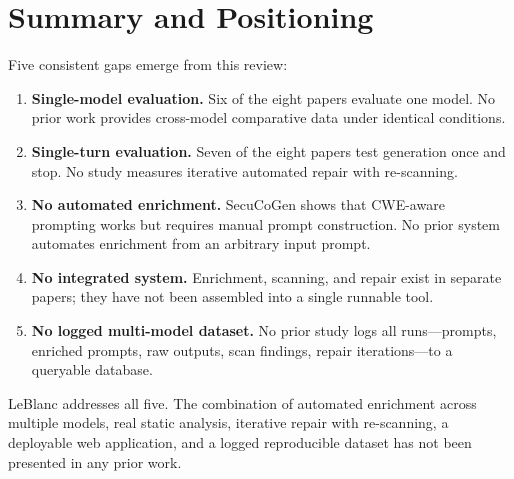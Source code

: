 \documentclass[12pt,a4paper]{report}
\begin{document}
\section{Summary and Positioning}
\label{sec:litgapsummary}

Five consistent gaps emerge from this review:

\begin{enumerate}
  \item \textbf{Single-model evaluation.} Six of the eight papers evaluate one
        model. No prior work provides cross-model comparative data under identical
        conditions.
  \item \textbf{Single-turn evaluation.} Seven of the eight papers test generation
        once and stop. No study measures iterative automated repair with
        re-scanning.
  \item \textbf{No automated enrichment.} SecuCoGen shows that CWE-aware prompting
        works but requires manual prompt construction. No prior system automates
        enrichment from an arbitrary input prompt.
  \item \textbf{No integrated system.} Enrichment, scanning, and repair exist in
        separate papers; they have not been assembled into a single runnable tool.
  \item \textbf{No logged multi-model dataset.} No prior study logs all
        runs---prompts, enriched prompts, raw outputs, scan findings, repair
        iterations---to a queryable database.
\end{enumerate}

LeBlanc addresses all five. The combination of automated enrichment across
multiple models, real static analysis, iterative repair with re-scanning, a
deployable web application, and a logged reproducible dataset has not been
presented in any prior work.

\printbibliography[heading=bibintoc,title={References}]
\end{document}
